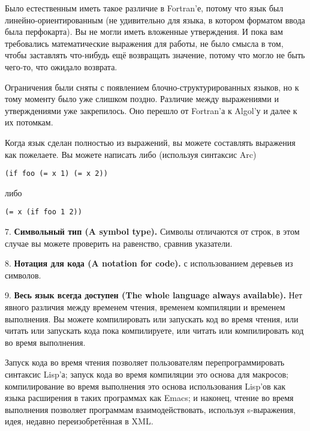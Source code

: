 \documentclass[ebook,12pt,oneside,openany]{memoir}
\begin{document}
Было естественным иметь такое различие в Fortran'е, потому что язык
был линейно-ориентированным (не удивительно для языка, в котором
форматом ввода была перфокарта). Вы не могли иметь вложенные
утверждения. И пока вам требовались математические выражения для
работы, не было смысла в том, чтобы заставлять что-нибудь ещё
возвращать значение, потому что могло не быть чего-то, что ожидало
возврата.\newline

Ограничения были сняты с появлением блочно-структурированных языков,
но к тому моменту было уже слишком поздно. Различие между выражениями
и утверждениями уже закрепилось. Оно перешло от Fortran'а к Algol'у и
далее к их потомкам.\newline

Когда язык сделан полностью из выражений, вы можете составлять
выражения как пожелаете. Вы можете написать либо (используя синтаксис
Arc) 

\begin{verbatim}
(if foo (= x 1) (= x 2))
\end{verbatim}

либо

\begin{verbatim}
(= x (if foo 1 2))
\end{verbatim}

7. \textbf{Символьный тип (A symbol type).} Символы отличаются от строк, в этом
случае вы можете проверить на равенство, сравнив указатели. \newline

8. \textbf{Нотация для кода (A notation for code).} с использованием деревьев из
символов. \newline

9. \textbf{Весь язык всегда доступен (The whole language always available).}
Нет явного различия между временем чтения, временем компиляции и
временем выполнения. Вы можете компилировать или запускать код во
время чтения, или читать или запускать кода пока компилируете, или
читать или компилировать код во время выполнения. \newline

Запуск кода во время чтения позволяет пользователям
перепрограммировать синтаксис Lisp'а; запуск кода во время компиляции
это основа для макросов; компилирование во время выполнения это основа
использования Lisp'ов как языка расширения в таких программах как
Emacs; и наконец, чтение во время выполнения позволяет программам
взаимодействовать, используя s-выражения, идея, недавно
переизобретённая в XML. \newline
\end{document}
